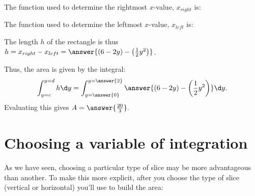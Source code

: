 \documentclass{ximera}
\begin{document}
\begin{example}
\begin{explanation}
\begin{image}
            \end{image}
            
            
The function used to determine the rightmost $x$-value, $x_{right}$ is:
\begin{multipleChoice}
\end{multipleChoice}

The function used to determine the leftmost $x$-value, $x_{left}$ is:
\begin{multipleChoice}
\end{multipleChoice}

The length $h$ of the rectangle is thus $h=x_{right}-x_{left} = \answer{(6-2y)-\left(\frac{1}{2}y^2\right)}$.

Thus, the area is given by the integral:
  \[
 \int_{y=c}^{y=d} h \d y =  \int_{y=\answer{0}}^{y=\answer{2}} \answer{(6-2y)-\left(\frac{1}{2}y^2\right)} \d y .
  \]
  Evaluating this gives $A= \answer{\frac{20}{3}}.$
 \end{explanation}
 
\end{example}

\section{Choosing a variable of integration}
As we have seen, choosing a particular type of slice may be more advantageous than another.  To make this more explicit, after you choose the type of slice (vertical or horizontal) you'll use to build the area:
\end{document}
